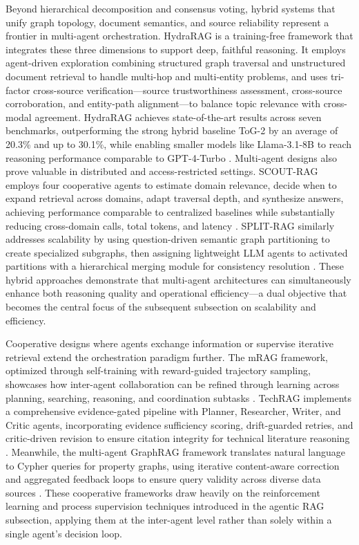 \documentclass[11pt]{article}
\begin{document}
Beyond hierarchical decomposition and consensus voting, hybrid systems that unify graph topology, document semantics, and source reliability represent a frontier in multi-agent orchestration. HydraRAG is a training-free framework that integrates these three dimensions to support deep, faithful reasoning. It employs agent-driven exploration combining structured graph traversal and unstructured document retrieval to handle multi-hop and multi-entity problems, and uses tri-factor cross-source verification---source trustworthiness assessment, cross-source corroboration, and entity-path alignment---to balance topic relevance with cross-modal agreement. HydraRAG achieves state-of-the-art results across seven benchmarks, outperforming the strong hybrid baseline ToG-2 by an average of 20.3\% and up to 30.1\%, while enabling smaller models like Llama-3.1-8B to reach reasoning performance comparable to GPT-4-Turbo \cite{ref327}. Multi-agent designs also prove valuable in distributed and access-restricted settings. SCOUT-RAG employs four cooperative agents to estimate domain relevance, decide when to expand retrieval across domains, adapt traversal depth, and synthesize answers, achieving performance comparable to centralized baselines while substantially reducing cross-domain calls, total tokens, and latency \cite{ref328}. SPLIT-RAG similarly addresses scalability by using question-driven semantic graph partitioning to create specialized subgraphs, then assigning lightweight LLM agents to activated partitions with a hierarchical merging module for consistency resolution \cite{ref329}. These hybrid approaches demonstrate that multi-agent architectures can simultaneously enhance both reasoning quality and operational efficiency---a dual objective that becomes the central focus of the subsequent subsection on scalability and efficiency.

Cooperative designs where agents exchange information or supervise iterative retrieval extend the orchestration paradigm further. The mRAG framework, optimized through self-training with reward-guided trajectory sampling, showcases how inter-agent collaboration can be refined through learning across planning, searching, reasoning, and coordination subtasks \cite{ref330}. TechRAG implements a comprehensive evidence-gated pipeline with Planner, Researcher, Writer, and Critic agents, incorporating evidence sufficiency scoring, drift-guarded retries, and critic-driven revision to ensure citation integrity for technical literature reasoning \cite{ref331}. Meanwhile, the multi-agent GraphRAG framework translates natural language to Cypher queries for property graphs, using iterative content-aware correction and aggregated feedback loops to ensure query validity across diverse data sources \cite{ref332}. These cooperative frameworks draw heavily on the reinforcement learning and process supervision techniques introduced in the agentic RAG subsection, applying them at the inter-agent level rather than solely within a single agent's decision loop.
\end{document}
